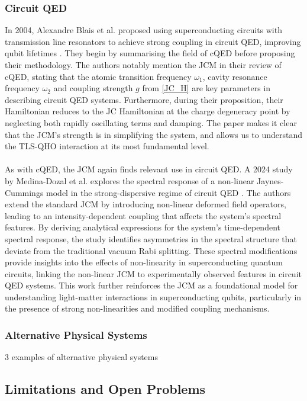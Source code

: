 \documentclass[12pt,a4paper]{article}
\begin{document}
\subsubsection{Circuit QED}

In 2004, Alexandre Blais et al. proposed using superconducting circuits with transmission line resonators to achieve strong coupling in circuit QED, improving qubit lifetimes \cite{Context2004-JC_CQED}. They begin by summarising the field of cQED before proposing their methodology. The authors notably mention the JCM in their review of cQED, stating that the atomic transition frequency  $\omega_1$, cavity resonance frequency $\omega_2$ and coupling strength $g$ from \eqref{JC_H} are key parameters in describing circuit QED systems. Furthermore, during their proposition, their Hamiltonian reduces to the JC Hamiltonian at the charge degeneracy point by neglecting both rapidly oscillating terms and damping. The paper makes it clear that the JCM's strength is in simplifying the system, and allows us to understand the TLS-QHO interaction at its most fundamental level. \\
\\
As with cQED, the JCM again finds relevant use in circuit QED. A 2024 study by Medina-Dozal et al. explores the spectral response of a non-linear Jaynes-Cummings model in the strong-dispersive regime of circuit QED \cite{}. The authors extend the standard JCM by introducing non-linear deformed field operators, leading to an intensity-dependent coupling that affects the system’s spectral features. By deriving analytical expressions for the system’s time-dependent spectral response, the study identifies asymmetries in the spectral structure that deviate from the traditional vacuum Rabi splitting. These spectral modifications provide insights into the effects of non-linearity in superconducting quantum circuits, linking the non-linear JCM to experimentally observed features in circuit QED systems. This work further reinforces the JCM as a foundational model for understanding light-matter interactions in superconducting qubits, particularly in the presence of strong non-linearities and modified coupling mechanisms.

\subsubsection{Alternative Physical Systems}

3 examples of alternative physical systems

\subsection{Limitations and Open Problems}
\end{document}
